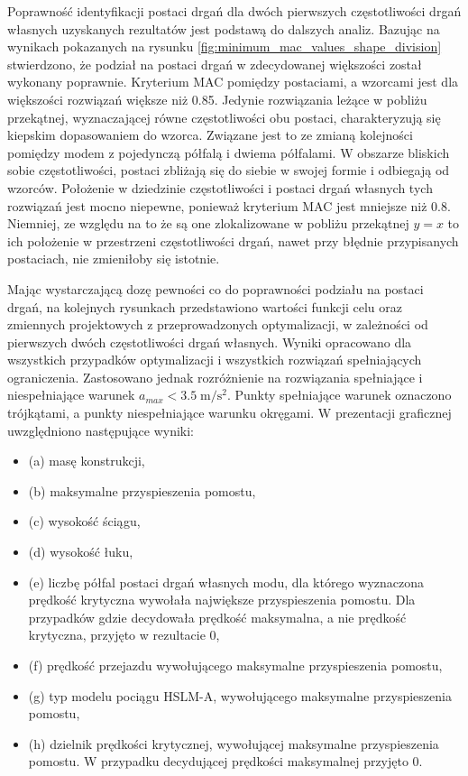 Poprawność identyfikacji postaci drgań dla dwóch pierwszych częstotliwości drgań własnych uzyskanych rezultatów jest podstawą do dalszych analiz. Bazując na wynikach pokazanych na rysunku \ref{fig:minimum_mac_values_shape_division} stwierdzono, że podział na postaci drgań w zdecydowanej większości został wykonany poprawnie. Kryterium MAC pomiędzy postaciami, a wzorcami jest dla większości rozwiązań większe niż 0.85. Jedynie rozwiązania leżące w pobliżu przekątnej, wyznaczającej równe częstotliwości obu postaci, charakteryzują się kiepskim dopasowaniem do wzorca. Związane jest to ze zmianą kolejności pomiędzy modem z pojedynczą półfalą i dwiema półfalami. W obszarze bliskich sobie częstotliwości, postaci zbliżają się do siebie w swojej formie i odbiegają od wzorców. Położenie w dziedzinie częstotliwości i postaci drgań własnych tych rozwiązań jest mocno niepewne, ponieważ kryterium MAC jest mniejsze niż 0.8. Niemniej, ze względu na to że są one zlokalizowane w pobliżu przekątnej $y=x$ to ich położenie w przestrzeni częstotliwości drgań, nawet przy błędnie przypisanych postaciach, nie zmieniłoby się istotnie. 

Mając wystarczającą dozę pewności co do poprawności podziału na postaci drgań, na kolejnych rysunkach przedstawiono wartości funkcji celu oraz zmiennych projektowych z przeprowadzonych optymalizacji, w zależności od pierwszych dwóch częstotliwości drgań własnych.
Wyniki opracowano dla wszystkich przypadków optymalizacji i wszystkich rozwiązań spełniających ograniczenia. Zastosowano jednak rozróżnienie na rozwiązania spełniające i niespełniające warunek $a_{max}<3.5\;\mathrm{m/s^2}$. Punkty spełniające warunek oznaczono trójkątami, a punkty niespełniające warunku okręgami. W prezentacji graficznej uwzględniono następujące wyniki:
\begin{itemize}
	\item (a) masę konstrukcji,
	\item (b) maksymalne przyspieszenia pomostu,
	\item (c) wysokość ściągu,
	\item (d) wysokość łuku,
	\item (e) liczbę półfal postaci drgań własnych modu, dla którego wyznaczona prędkość krytyczna wywołała największe przyspieszenia pomostu. Dla przypadków gdzie decydowała prędkość maksymalna, a nie prędkość krytyczna, przyjęto w rezultacie 0,
	\item (f) prędkość przejazdu wywołującego maksymalne przyspieszenia pomostu,
	\item (g) typ modelu pociągu HSLM-A, wywołującego maksymalne przyspieszenia pomostu,
	\item (h) dzielnik prędkości krytycznej, wywołującej maksymalne przyspieszenia pomostu. W przypadku decydującej prędkości maksymalnej przyjęto 0.
\end{itemize}

